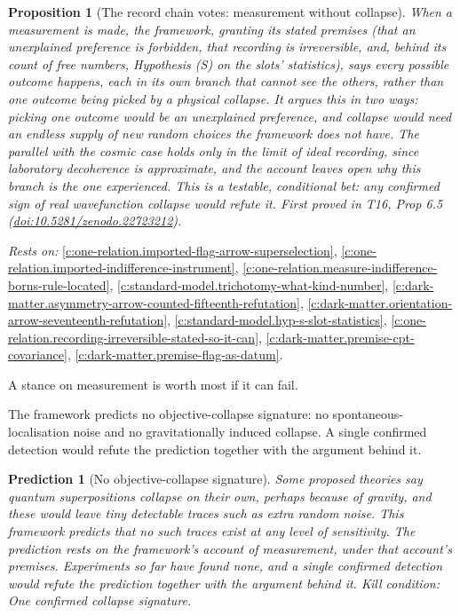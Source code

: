 \documentclass[11pt]{article}
\newtheorem{proposition}[theorem]{Proposition}
\newtheorem{prediction}[theorem]{Prediction}
\theoremstyle{definition}
\theoremstyle{plain}
\begin{document}
\begin{proposition}[The record chain votes: measurement without collapse]\label{c:one-relation.record-chain-votes-measurement-without-collapse}
When a measurement is made, the framework, granting its stated premises (that an unexplained preference is forbidden, that recording is irreversible, and, behind its count of free numbers, Hypothesis (S) on the slots' statistics), says every possible outcome happens, each in its own branch that cannot see the others, rather than one outcome being picked by a physical collapse. It argues this in two ways: picking one outcome would be an unexplained preference, and collapse would need an endless supply of new random choices the framework does not have. The parallel with the cosmic case holds only in the limit of ideal recording, since laboratory decoherence is approximate, and the account leaves open why this branch is the one experienced. This is a testable, conditional bet: any confirmed sign of real wavefunction collapse would refute it.
\emph{First proved in} T16, Prop 6.5 (\href{https://doi.org/10.5281/zenodo.22723212}{doi:10.5281/zenodo.22723212}).
\end{proposition}
\noindent\emph{Rests on:} \ref{c:one-relation.imported-flag-arrow-superselection}, \ref{c:one-relation.imported-indifference-instrument}, \ref{c:one-relation.measure-indifference-borns-rule-located}, \ref{c:standard-model.trichotomy-what-kind-number}, \ref{c:dark-matter.asymmetry-arrow-counted-fifteenth-refutation}, \ref{c:dark-matter.orientation-arrow-seventeenth-refutation}, \ref{c:standard-model.hyp-s-slot-statistics}, \ref{c:one-relation.recording-irreversible-stated-so-it-can}, \ref{c:dark-matter.premise-cpt-covariance}, \ref{c:dark-matter.premise-flag-as-datum}.

A stance on measurement is worth most if it can fail.

The framework predicts no objective-collapse signature: no spontaneous-localisation noise and no gravitationally induced collapse. A single confirmed detection would refute the prediction together with the argument behind it.

\begin{prediction}[No objective-collapse signature]\label{c:pred.no-objective-collapse}
Some proposed theories say quantum superpositions collapse on their own, perhaps because of gravity, and these would leave tiny detectable traces such as extra random noise. This framework predicts that no such traces exist at any level of sensitivity. The prediction rests on the framework's account of measurement, under that account's premises. Experiments so far have found none, and a single confirmed detection would refute the prediction together with the argument behind it.
\emph{Kill condition:} One confirmed collapse signature.
\end{prediction}
\end{document}
